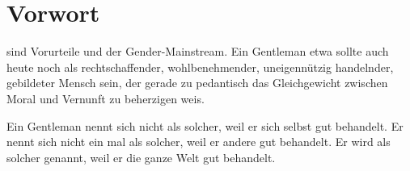 \chapter*{Vorwort}
 sind Vorurteile und der Gender-Mainstream. Ein Gentleman etwa sollte auch heute noch als rechtschaffender, 
 wohlbenehmender, uneigennützig handelnder, gebildeter Mensch sein, der gerade zu pedantisch das Gleichgewicht 
 zwischen Moral und Vernunft zu beherzigen weis.



 Ein Gentleman nennt sich nicht als solcher, weil er sich selbst gut behandelt.
 Er nennt sich nicht ein mal als solcher, weil  er andere gut behandelt.
 Er wird als solcher genannt, weil er die ganze Welt gut behandelt.

